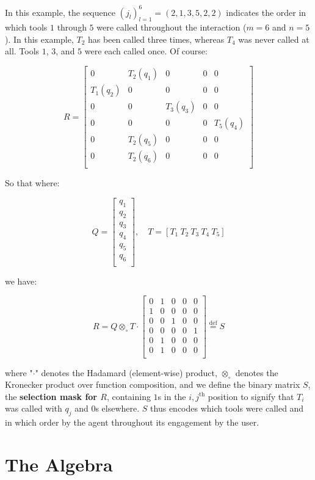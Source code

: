 \documentclass{article}
\begin{document}
In this example, the sequence $(j_l)_{l=1}^6 = (2,1,3,5,2,2)$ indicates the order in which tools $1$ through $5$ were called throughout the interaction ($m=6$ and $n=5$). In this example, $T_2$ has been called three times, whereas $T_4$ was never called at all. Tools $1$, $3$, and $5$ were each called once. Of course:

\[
R =
\begin{bmatrix}
0 & T_2(q_1) & 0 & 0 & 0 \\
T_1(q_2) & 0 & 0 & 0 & 0 \\
0 & 0 & T_3(q_3) & 0 & 0 \\
0 & 0 & 0 & 0 & T_5(q_4) \\
0 & T_2(q_5) & 0 & 0 & 0 \\
0 & T_2(q_6) & 0 & 0 & 0 \\
\end{bmatrix}
\]

So that where:

\[
Q =
\begin{bmatrix}
q_1 \\
q_2 \\
q_3 \\
q_4 \\
q_5 \\
q_6 \\
\end{bmatrix}, \quad
T = [T_1 \ T_2 \ T_3 \ T_4 \ T_5]
\]

we have:

\[
R = Q \otimes_\circ T \cdot
\begin{bmatrix}
0 & 1 & 0 & 0 & 0 \\
1 & 0 & 0 & 0 & 0 \\
0 & 0 & 1 & 0 & 0 \\
0 & 0 & 0 & 0 & 1 \\
0 & 1 & 0 & 0 & 0 \\
0 & 1 & 0 & 0 & 0 \\
\end{bmatrix}
\stackrel{\text{def}}{=} S
\]

where "$\cdot$" denotes the Hadamard (element-wise) product, $\otimes_\circ$ denotes the Kronecker product over function composition, and we define the binary matrix $S$, the \textbf{selection mask for $R$}, containing $1$s in the $i,j^{\text{th}}$ position to signify that $T_i$ was called with $q_j$ and $0$s elsewhere. $S$ thus encodes which tools were called and in which order by the agent throughout its engagement by the user.

\section*{The Algebra}
\end{document}
